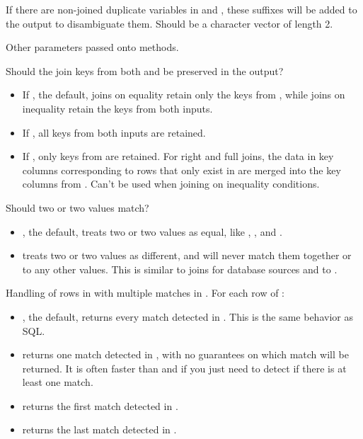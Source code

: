 \documentclass[a4paper]{book}
\begin{document}
\begin{Arguments}
\begin{ldescription}
\item[\code{suffix}] If there are non-joined duplicate variables in  and
, these suffixes will be added to the output to disambiguate them.
Should be a character vector of length 2.

\item[\code{...}] Other parameters passed onto methods.

\item[\code{keep}] Should the join keys from both  and  be preserved in the
output?
\begin{itemize}

\item{} If , the default, joins on equality retain only the keys from ,
while joins on inequality retain the keys from both inputs.
\item{} If , all keys from both inputs are retained.
\item{} If , only keys from  are retained. For right and full joins,
the data in key columns corresponding to rows that only exist in  are
merged into the key columns from . Can't be used when joining on
inequality conditions.

\end{itemize}


\item[\code{na\_matches}] Should two  or two  values match?
\begin{itemize}

\item{} , the default, treats two  or two  values as equal, like
, , and .
\item{}  treats two  or two  values as different, and will
never match them together or to any other values. This is similar to joins
for database sources and to .

\end{itemize}


\item[\code{multiple}] Handling of rows in  with multiple matches in .
For each row of :
\begin{itemize}

\item{} , the default, returns every match detected in . This is the
same behavior as SQL.
\item{}  returns one match detected in , with no guarantees on which
match will be returned. It is often faster than  and 
if you just need to detect if there is at least one match.
\item{}  returns the first match detected in .
\item{}  returns the last match detected in .


\end{itemize}
\end{ldescription}
\end{Arguments}
\end{document}
